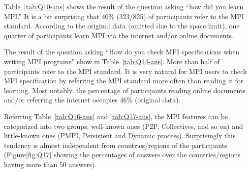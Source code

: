 \documentclass[sigconf,nonacm]{acmart}
\begin{document}
Table~\ref{tab:Q10-ans} shows the result of the question asking ``how
did you learn MPI.'' It is a bit surprising that 40\% (323/825) of
participants refer to the MPI standard. According to the original
data (omitted due to the space limit), one quarter of participants
learn MPI via the internet and/or online documents.

The result of the question asking ``How do you check MPI
specifications when writing MPI programs'' show in
Table~\ref{tab:Q14-ans}. More than half of participants refer to the
MPI standard. It is very natural for MPI users to check MPI
specification by referring the MPI standard more often than reading it
for learning. Most notably, the percentage of participants reading
online documents and/or referring the internet occupies 46\% (original
data).

Referring Table~\ref{tab:Q16-ans} and \ref{tab:Q17-ans}, the MPI
features can be categorized into two groups; well-known ones (P2P,
Collectives, and so on) and little-known ones (PMPI, Persistent and
Dynamic process). Surprisingly this tendency is almost independent
from countries/regions of the participants
(Figure\ref{fig:Q17} showing the percentages of answers over the
countries/regions having more than 50 answers).

\end{document}
